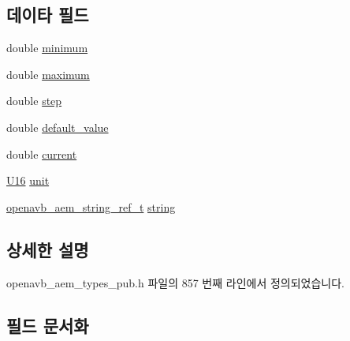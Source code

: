 \subsection*{데이타 필드}
\begin{DoxyCompactItemize}
\item 
double \hyperlink{structopenavb__aem__control__value__format__control__linear__double__t_a4510e71778a7b0d3a4be9caaa8410a95}{minimum}
\item 
double \hyperlink{structopenavb__aem__control__value__format__control__linear__double__t_a26e8b97fa5003d22d7463f38699c669a}{maximum}
\item 
double \hyperlink{structopenavb__aem__control__value__format__control__linear__double__t_a4736138d712d9ee570d0652f08a4786a}{step}
\item 
double \hyperlink{structopenavb__aem__control__value__format__control__linear__double__t_a00fc46868f31d316a5b5289dfdb259a5}{default\+\_\+value}
\item 
double \hyperlink{structopenavb__aem__control__value__format__control__linear__double__t_ae36027a2ebe1db7af7b94bb1f5ebb1fc}{current}
\item 
\hyperlink{openavb__types__base__pub_8h_a0a0a322d5fa4a546d293a77ba8b4a71f}{U16} \hyperlink{structopenavb__aem__control__value__format__control__linear__double__t_a0b3ff376c10369016824076deacc055e}{unit}
\item 
\hyperlink{structopenavb__aem__string__ref__t}{openavb\+\_\+aem\+\_\+string\+\_\+ref\+\_\+t} \hyperlink{structopenavb__aem__control__value__format__control__linear__double__t_a1f81001cefa769cb3651172fd5ab0748}{string}
\end{DoxyCompactItemize}


\subsection{상세한 설명}


openavb\+\_\+aem\+\_\+types\+\_\+pub.\+h 파일의 857 번째 라인에서 정의되었습니다.



\subsection{필드 문서화}
